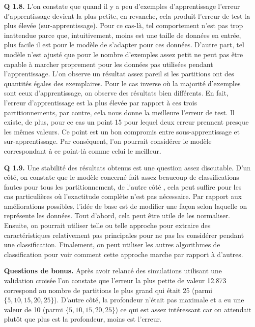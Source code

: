\documentclass[a4paper,11pt]{article}
\theoremstyle{plain}
\theoremstyle{definition}
\begin{document}
\textbf{Q 1.8.} L'on constate que quand il y a peu d'exemples d'apprentissage l'erreur d'apprentissage devient la plus petite, en revanche, cela produit l'erreur de test la plus élevée (sur-apprentissage). Pour ce cas-là, tel comportement n'est pas trop inattendue parce que, intuitivement, moins est une taille de données en entrée, plus facile il est pour le modèle de s'adapter pour ces données. D'autre part, tel modèle n'est ajusté que pour le nombre d'exemples assez petit ne peut pas être capable à marcher proprement pour les données pas utilisées pendant l'apprentissage. L'on observe un résultat assez pareil si les partitions ont des quantités égales des exemplaires. Pour le cas inverse où la majorité d'exemples sont ceux d'apprentissage, on observe des résultats bien différents. En fait, l'erreur d'apprentissage est la plus élevée par rapport à ces trois partitionnements, par contre, cela nous donne la meilleure l'erreur de test. Il existe, de plus, pour ce cas un point 15 pour lequel deux erreur prennent presque les mêmes valeurs. Ce point est un bon compromis entre sous-apprentissage et sur-apprentissage. Par conséquent, l'on pourrait considérer le modèle correspondant à ce point-là comme celui le meilleur.

\textbf{Q 1.9.} Une stabilité des résultats obtenus est une question assez discutable. D'un côté, on constate que le modèle concerné fait assez beaucoup de classifications fautes pour tous les partitionnement, de l'autre côté , cela peut suffire pour les cas particulières où l'exactitude complète n'est pas nécessaire. Par rapport aux améliorations possibles, l'idée de base est de modifier une façon selon laquelle on représente les données. Tout d'abord, cela peut être utile de les normaliser. Ensuite, on pourrait utiliser telle ou telle approche pour extraire des caractéristiques relativement pas principales pour ne pas les considérer pendant une classification. Finalement, on peut utiliser les autres algorithmes de classification pour voir comment cette approche marche par rapport à d'autres.

\textbf{Questions de bonus.} Après avoir relancé des simulations utilisant une validation croisée l'on constate que l'erreur la plus petite de valeur 12.873 correspond au nombre de partitions le plus grand qui était 25 (parmi $\{5, 10, 15, 20, 25\}$). D'autre côté, la profondeur n'était pas maximale et a eu une valeur de 10 (parmi $\{5, 10, 15, 20, 25\}$) ce qui est assez intéressant car on attendait plutôt que plus est la profondeur, moins est l'erreur.
\end{document}
